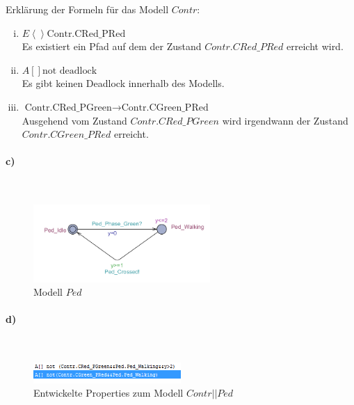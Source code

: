 Erklärung der Formeln für das Modell $Contr$:

\begin{enumerate}[i)]

	\item $E \left<\right> \text{Contr.CRed\_PRed} $\\
	Es existiert ein Pfad auf dem der Zustand $Contr.CRed\_PRed$ erreicht wird.
	
	\item $A[] \text{not deadlock}$ \\
	Es gibt keinen Deadlock innerhalb des Modells.
	
	\item $\text{Contr.CRed\_PGreen} \rightarrow  \text{Contr.CGreen\_PRed}$ \\
	Ausgehend vom Zustand $Contr.CRed\_PGreen$ wird irgendwann der Zustand $Contr.CGreen\_PRed$ erreicht.
	
\end{enumerate}

\paragraph{c)}\mbox{} \\

\begin{figure}[H] 
	\centering 
	\includegraphics[width=0.6\textwidth]{./UPAAAL_Screens/Pedestrian}
	\caption[Aufgabe 2c)]{Modell $Ped$}    
\end{figure}

\paragraph{d)}\mbox{} \\

\begin{figure}[H] 
	\centering 
	\includegraphics[width=0.5\textwidth]{./UPAAAL_Screens/2d_Verifyer}
	\caption[Aufgabe 2d)]{Entwickelte Properties zum Modell $Contr||Ped$}    
\end{figure}

